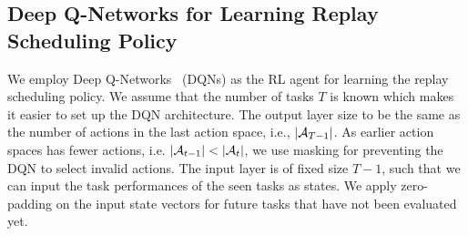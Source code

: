 






\subsection{Deep Q-Networks for Learning Replay Scheduling Policy}\label{paperD:sec:dqn_for_learning_replay_scheduling_policy}

We employ Deep Q-Networks~ (DQNs) as the RL agent for learning the replay scheduling policy. We assume that the number of tasks $T$ is known which makes it easier to set up the DQN architecture. The output layer size to be the same as the number of actions in the last action space, i.e., $|{\mathcal{A}}_{T-1}|$. As earlier action spaces has fewer actions, i.e. $|{\mathcal{A}}_{t-1}| < |{\mathcal{A}}_{t}|$, we use masking for preventing the DQN to select invalid actions. The input layer is of fixed size $T-1$, such that we can input the task performances of the seen tasks as states. We apply zero-padding on the input state vectors for future tasks that have not been evaluated yet.       

